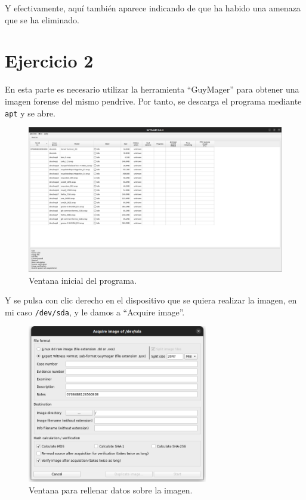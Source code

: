 \documentclass{article}
\begin{document}
Y efectivamente, aquí también aparece indicando de que ha habido una amenaza que se ha eliminado.

\newpage

\section*{Ejercicio 2}

En esta parte es necesario utilizar la herramienta ``GuyMager'' para obtener una imagen forense del mismo pendrive. Por tanto, se descarga el programa mediante \verb|apt| y se abre.

\begin{figure}[H]
    \centering
    \includegraphics[width=\textwidth]{imagenes/Captura desde 2022-12-02 19-33-30.png}
    \caption{Ventana inicial del programa.}
\end{figure}

Y se pulsa con clic derecho en el dispositivo que se quiera realizar la imagen, en mi caso \verb|/dev/sda|, y le damos a ``Acquire image''.

\begin{figure}[H]
    \centering
    \includegraphics[width=0.7\textwidth]{imagenes/Captura desde 2022-12-02 19-33-37.png}
    \caption{Ventana para rellenar datos sobre la imagen.}
\end{figure}
\end{document}
